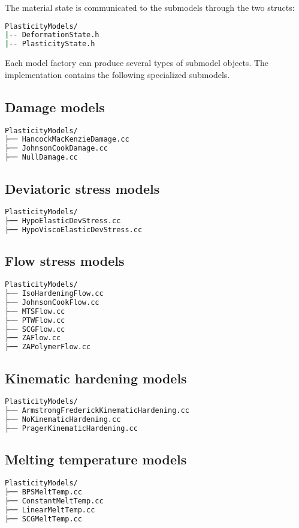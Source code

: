 The material state is communicated to the submodels through the
two \textsf{struct}s:
\begin{lstlisting}[language=sh, backgroundcolor=\color{background}]
PlasticityModels/
|-- DeformationState.h
|-- PlasticityState.h
\end{lstlisting}

Each model factory can produce several types of submodel objects.  
The \Vaango implementation contains the following specialized
submodels.

\subsection{Damage models}
\begin{lstlisting}[language=sh, backgroundcolor=\color{background}]
PlasticityModels/
├── HancockMacKenzieDamage.cc
├── JohnsonCookDamage.cc
├── NullDamage.cc
\end{lstlisting}

\subsection{Deviatoric stress models}
\begin{lstlisting}[language=sh, backgroundcolor=\color{background}]
PlasticityModels/
├── HypoElasticDevStress.cc
├── HypoViscoElasticDevStress.cc
\end{lstlisting}

\subsection{Flow stress models}
\begin{lstlisting}[language=sh, backgroundcolor=\color{background}]
PlasticityModels/
├── IsoHardeningFlow.cc
├── JohnsonCookFlow.cc
├── MTSFlow.cc
├── PTWFlow.cc
├── SCGFlow.cc
├── ZAFlow.cc
├── ZAPolymerFlow.cc
\end{lstlisting}

\subsection{Kinematic hardening models}
\begin{lstlisting}[language=sh, backgroundcolor=\color{background}]
PlasticityModels/
├── ArmstrongFrederickKinematicHardening.cc
├── NoKinematicHardening.cc
├── PragerKinematicHardening.cc
\end{lstlisting}

\subsection{Melting temperature models}
\begin{lstlisting}[language=sh, backgroundcolor=\color{background}]
PlasticityModels/
├── BPSMeltTemp.cc
├── ConstantMeltTemp.cc
├── LinearMeltTemp.cc
├── SCGMeltTemp.cc
\end{lstlisting}

